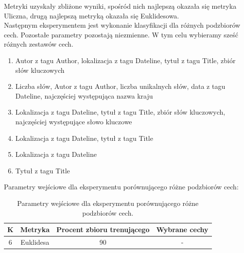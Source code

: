\documentclass{classrep}
\begin{document}
Metryki uzyskały zbliżone wyniki, spośród nich najlepszą okazała się metryka Uliczna, drugą najlepszą metryką okazała się Euklidesowa. \\



Następnym eksperymentem jest wykonanie klasyfikacji dla różnych podzbiorów cech. Pozostałe parametry pozostają niezmienne. W tym celu wybieramy sześć różnych zestawów cech. 

\begin{enumerate}
\item Autor z tagu Author, lokalizacja z tagu Dateline, tytuł z tagu Title, zbiór słów kluczowych
\item Liczba słów, Autor z tagu Author, liczba unikalnych słów, data z tagu Dateline, najczęściej występująca nazwa kraju
\item Lokalizacja z tagu Dateline, tytuł z tagu Title, zbiór słów kluczowych, najczęściej występujące słowo kluczowe
\item Lokalizacja z tagu Dateline, tytuł z tagu Title
\item Lokalizacja z tagu Dateline
\item Tytuł z tagu Title
\end{enumerate}

Parametry wejściowe dla eksperymentu porównującego różne podzbiorów cech:
 
\begin{table}[h!]
\caption{Parametry wejściowe dla eksperymentu porównującego różne podzbiorów cech. }
\centering
\vspace{0.1cm}
 \begin{tabular}{c c c c}
    \textbf{K} & \textbf{Metryka}   & \textbf{Procent zbioru trenującego}  & \textbf{Wybrane cechy}   \\
\hline
6 & Euklidesa & 90 & -\\
\end {tabular}
\label {Parametry wejściowe dla eksperymentu porównującego różne podzbiorów cech. }
\end{table}
\end{document}
